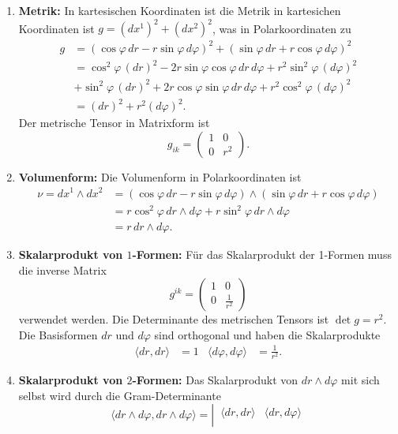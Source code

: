 \begin{enumerate}
\item
{\bf Metrik:}
In kartesischen Koordinaten ist die Metrik in kartesichen Koordinaten
ist $g=(dx^1)^2+(dx^2)^2$, was in Polarkoordinaten zu
\begin{align*}
g
&=
(\cos\varphi\,dr - r\sin\varphi\,d\varphi)^2
+
(\sin\varphi\,dr + r\cos\varphi\,d\varphi)^2
\\
&=
\cos^2\varphi\,(dr)^2
-
2r\sin\varphi\cos\varphi\,dr\,d\varphi
+
r^2\sin^2\varphi\,(d\varphi)^2
\\
&+
\sin^2\varphi\,(dr)^2
+
2r\cos\varphi\sin\varphi\,dr\,d\varphi
+
r^2\cos^2\varphi\,(d\varphi)^2
\\
&=
(dr)^2 + r^2(d\varphi)^2.
\end{align*}
Der metrische Tensor in Matrixform ist
\[
g_{ik}
=
\begin{pmatrix}
1&0\\
0&r^2
\end{pmatrix}.
\]
\item {\bf Volumenform:}
Die Volumenform in Polarkoordinaten ist
\begin{align*}
\nu
=
dx^1\wedge dx^2
&=
(\cos\varphi\,dr - r\sin\varphi\,d\varphi)
\wedge
(\sin\varphi\,dr + r\cos\varphi\,d\varphi)
\\
&=
r \cos^2\varphi\,dr \wedge d\varphi
+
r \sin^2\varphi\,dr \wedge d\varphi
\\
&= r \,dr\wedge d\varphi.
\end{align*}
\item{\bf Skalarprodukt von $1$-Formen:}
Für das Skalarprodukt der 1-Formen muss die inverse Matrix
\[
g^{ik}
=
\begin{pmatrix}
1&0\\
0&\frac{1}{r^2}
\end{pmatrix}
\]
verwendet werden.
Die Determinante des metrischen Tensors ist $\det g = r^2$.
Die Basisformen $dr$ und $d\varphi$ sind orthogonal und haben die
Skalarprodukte
\begin{align*}
\langle dr,dr\rangle
&=
1
&
\langle d\varphi,d\varphi\rangle
&=
\frac{1}{r^2}.
\end{align*}
\item{\bf Skalarprodukt von $2$-Formen:}
Das Skalarprodukt von $dr\wedge d\varphi$ mit sich selbst wird durch die
Gram-Determinante
\[
\langle dr\wedge d\varphi,dr\wedge d\varphi\rangle
=
\left|\,
\begin{matrix}
\langle dr,dr\rangle         & \langle dr,d\varphi\rangle \\

\end{matrix}\]
\end{enumerate}
